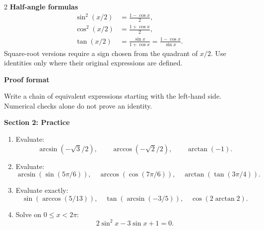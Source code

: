 \documentclass[11pt]{article}
\begin{document}
\begin{multicols}{2}
\textbf{Half-angle formulas}
\[
\begin{aligned}
  \sin^2(x/2)&=\frac{1-\cos x}{2},\\
  \cos^2(x/2)&=\frac{1+\cos x}{2},\\
  \tan(x/2)&=\frac{\sin x}{1+\cos x}
           =\frac{1-\cos x}{\sin x}.
\end{aligned}
\]
Square-root versions require a sign chosen from the quadrant of $x/2$.
Use identities only where their original expressions are defined.

\medskip
\textbf{Proof format}

Write a chain of equivalent expressions starting with the left-hand side.
Numerical checks alone do not prove an identity.
\end{multicols}

\newpage
\begin{center}{\large\textbf{Section 2: Practice}}\end{center}
\begin{enumerate}[leftmargin=*,itemsep=0pt,series=chapterSeven]
  \item Evaluate:
  \[
    \arcsin(-\sqrt3/2),\qquad \arccos(-\sqrt2/2),\qquad \arctan(-1).
  \]
  \par{}

  \item Evaluate:
  \[
    \arcsin(\sin(5\pi/6)),\quad
    \arccos(\cos(7\pi/6)),\quad
    \arctan(\tan(3\pi/4)).
  \]
  \par{}

  \item Evaluate exactly:
  \[
    \sin(\arccos(5/13)),\quad
    \tan(\arcsin(-3/5)),\quad
    \cos(2\arctan 2).
  \]
  \par{}

  \item Solve on $0\le x<2\pi$:
  \[
    2\sin^2x-3\sin x+1=0.
  \]
  \par{}
\end{enumerate}
\end{document}
